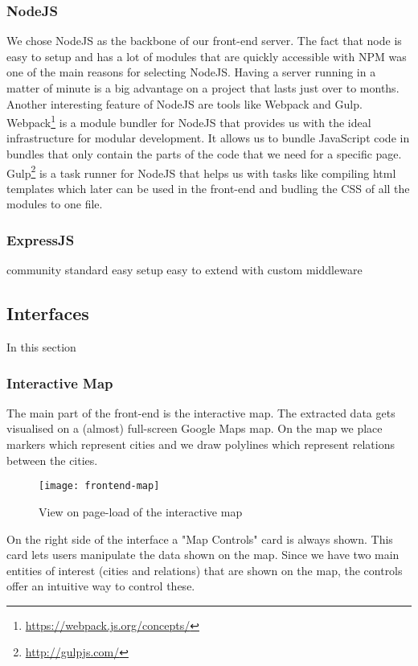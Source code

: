 \subsubsection{NodeJS}
We chose NodeJS as the backbone of our front-end server. The fact that node is easy to setup and has a lot of modules that are quickly accessible with NPM was one of the main reasons for selecting NodeJS. Having a server running in a matter of minute is a big advantage on a project that lasts just over to months.\\
Another interesting feature of NodeJS are tools like Webpack and Gulp. Webpack\footnote{\url{https://webpack.js.org/concepts/}} is a module bundler for NodeJS that provides us with the ideal infrastructure for modular development. It allows us to bundle JavaScript code in bundles that only contain the parts of the code that we need for a specific page. Gulp\footnote{\url{http://gulpjs.com/}} is a task runner for NodeJS that helps us with tasks like compiling html templates which later can be used in the front-end and budling the CSS of all the modules to one file.
\subsubsection{ExpressJS}

community standard
easy setup
easy to extend with custom middleware

\subsection{Interfaces}
In this section 
\subsubsection{Interactive Map}
The main part of the front-end is the interactive map. The extracted data gets visualised on a (almost) full-screen Google Maps map. On the map we place markers which represent cities and we draw polylines which represent relations between the cities.

\begin{figure}[h]
\centering
\texttt{[image: frontend-map]}
\caption{View on page-load of the interactive map}
\label{fig:frontend-map}
\end{figure}

On the right side of the interface a "Map Controls" card is always shown. This card lets users manipulate the data shown on the map. Since we have two main entities of interest (cities and relations) that are shown on the map, the controls offer an intuitive way to control these.\\

